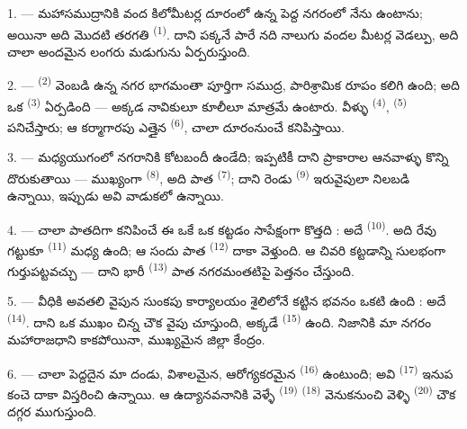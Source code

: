 \VUsaut{2.0mm}
\VUsaut{3.0mm}
\VUfilet{16mm}
\VUsaut{5.6mm}
\VUsaut{1.4mm}
\VUsaut{2.2mm}

\VUsaut{3.0mm}

1. --- మహాసముద్రానికి వంద కిలోమీటర్ల దూరంలో ఉన్న పెద్ద నగరంలో నేను ఉంటాను; అయినా అది
మొదటి తరగతి  \textsuperscript{(1)}. దాని పక్కనే పారే నది నాలుగు వందల
మీటర్ల వెడల్పు, అది చాలా అందమైన లంగరు మడుగును ఏర్పరుస్తుంది.

2. ---  \textsuperscript{(2)} వెంబడి ఉన్న నగర భాగమంతా పూర్తిగా సముద్ర,
పారిశ్రామిక రూపం కలిగి ఉంది; అది ఒక  \textsuperscript{(3)}
ఏర్పడింది — అక్కడ నావికులూ కూలీలూ మాత్రమే ఉంటారు. వీళ్ళు 
\textsuperscript{(4)},  \textsuperscript{(5)} పనిచేస్తారు; ఆ
కర్మాగారపు ఎత్తైన  \textsuperscript{(6)},  చాలా
దూరంనుంచే కనిపిస్తాయి.

3. --- మధ్యయుగంలో నగరానికి కోటబందీ ఉండేది; ఇప్పటికీ దాని ప్రాకారాల ఆనవాళ్ళు కొన్ని
దొరుకుతాయి — ముఖ్యంగా  \textsuperscript{(8)}, అది పాత
 \textsuperscript{(7)}; దాని రెండు 
\textsuperscript{(9)} ఇరువైపులా నిలబడి ఉన్నాయి, ఇప్పుడు అవి  వాడుకలో
ఉన్నాయి.

4. --- చాలా పాతదిగా కనిపించే ఈ  ఒకే ఒక కట్టడం సాపేక్షంగా కొత్తది : అదే
 \textsuperscript{(10)}. అది రేవు గట్టుకూ 
\textsuperscript{(11)} మధ్య ఉంది; ఆ సందు పాత  \textsuperscript{(12)}
దాకా వెళ్తుంది. ఆ చివరి కట్టడాన్ని సులభంగా గుర్తుపట్టవచ్చు — దాని భారీ
 \textsuperscript{(13)} పాత నగరమంతటిపై పెత్తనం చేస్తుంది.

5. --- వీధికి అవతలి వైపున సుంకపు కార్యాలయం శైలిలోనే కట్టిన భవనం ఒకటి 
ఉంది : అదే  \textsuperscript{(14)}. దాని ఒక ముఖం చిన్న చౌక వైపు
చూస్తుంది, అక్కడే  \textsuperscript{(15)} ఉంది. నిజానికి మా నగరం
మహారాజధాని కాకపోయినా, ముఖ్యమైన జిల్లా కేంద్రం.

\VUsaut{5.0mm}
\VUsaut{3.4mm}

6. --- చాలా పెద్దదైన మా దండు, విశాలమైన, ఆరోగ్యకరమైన 
\textsuperscript{(16)} ఉంటుంది; అవి  \textsuperscript{(17)} ఇనుప
కంచె దాకా విస్తరించి ఉన్నాయి. ఆ ఉద్యానవనానికి వెళ్ళే 
\textsuperscript{(19)}  \textsuperscript{(18)} వెనుకనుంచి వెళ్ళి
 \textsuperscript{(20)} చౌక దగ్గర ముగుస్తుంది.

